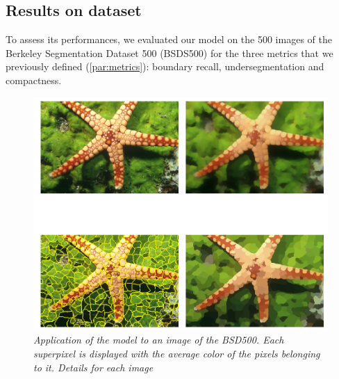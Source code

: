 \documentclass{article}
\begin{document}
    \subsection{Results on dataset}
        To assess its performances, we evaluated our model on the 500 images of the Berkeley Segmentation Dataset 500 (BSDS500)\cite{arbelaez2011} for the three metrics that we previously defined (\ref{par:metrics}): boundary recall, undersegmentation and compactness.
        \begin{figure}[!htb]
            \centering
            \includegraphics[width=.8\linewidth]{pics/img_bsd_res2.png}
            \caption{\textit{Application of the model to an image of the BSD500. Each superpixel is displayed with the average color of the pixels belonging to it. Details for each image \cite{todo}}}
        \end{figure}
\end{document}
